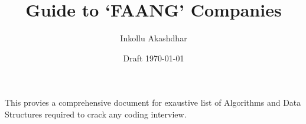 \documentclass[twoside,12pt,a4paper,english]{article}
\title{\Huge Guide to `FAANG' Companies}
\author{\Large Inkollu Akashdhar}
\date{Draft \today}
\begin{document}
\begin{titlepage}
\maketitle
\end{titlepage}

This provies a comprehensive document for exaustive list of 
Algorithms and Data Structures required to crack any coding interview.
\end{document}
